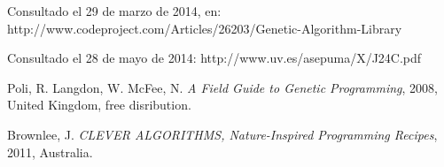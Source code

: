 \documentclass[letterpaper]{article}
\begin{document}
\begin{thebibliography}{99}

Consultado el 29 de marzo de 2014, en: http://www.codeproject.com/Articles/26203/Genetic-Algorithm-Library

 Consultado el 28 de mayo de 2014: http://www.uv.es/asepuma/X/J24C.pdf

 Poli, R. Langdon, W. McFee, N. \textit{A Field Guide to Genetic Programming}, 2008, United Kingdom, free disribution.

Brownlee, J. \textit{CLEVER ALGORITHMS, Nature-Inspired Programming Recipes}, 2011, Australia.
\end{thebibliography}
\end{document}
